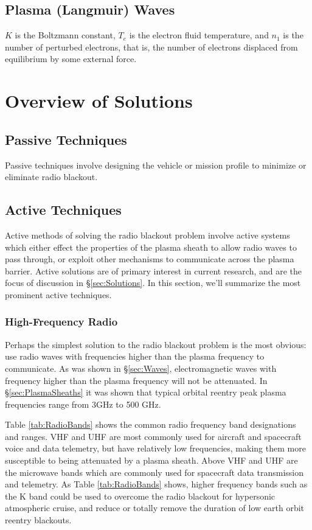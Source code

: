 \documentclass[twocolumn]{article}
\begin{document}
\subsection*{Plasma (Langmuir) Waves}
$K$ is the Boltzmann constant, $T_e$ is the electron fluid temperature, and $n_1$ is the number of perturbed electrons, that is, the number of electrons displaced from equilibrium by some external force.



\section{Overview of Solutions} \label{sec:Overview}
\subsection*{Passive Techniques}
	Passive techniques involve designing the vehicle or mission profile to minimize or eliminate radio blackout.
\subsection*{Active Techniques}
	Active methods of solving the radio blackout problem involve active systems which either effect the properties of the plasma sheath to allow radio waves to pass through, or exploit other mechanisms to communicate across the plasma barrier.
	Active solutions are of primary interest in current research, and are the focus of discussion in \S\ref{sec:Solutions}.
	In this section, we'll summarize the most prominent active techniques.
	
	\subsubsection*{High-Frequency Radio}
	Perhaps the simplest solution to the radio blackout problem is the most obvious: use radio waves with frequencies higher than the plasma frequency to communicate.
	As was shown in \S\ref{sec:Waves}, electromagnetic waves with frequency higher than the plasma frequency will not be attenuated.
	In \S\ref{sec:PlasmaSheaths} it was shown that typical orbital reentry peak plasma frequencies range from 3GHz to 500 GHz.
	
	Table \ref{tab:RadioBands} shows the common radio frequency band designations and ranges.
	VHF and UHF are most commonly used for aircraft and spacecraft voice and data telemetry, but have relatively low frequencies, making them more susceptible to being attenuated by a plasma sheath.
	Above VHF and UHF are the microwave bands which are commonly used for spacecraft data transmission and telemetry.
	As Table \ref{tab:RadioBands} shows, higher frequency bands such as the K band could be used to overcome the radio blackout for hypersonic atmospheric cruise, and reduce or totally remove the duration of low earth orbit reentry blackouts.
	
\end{document}
